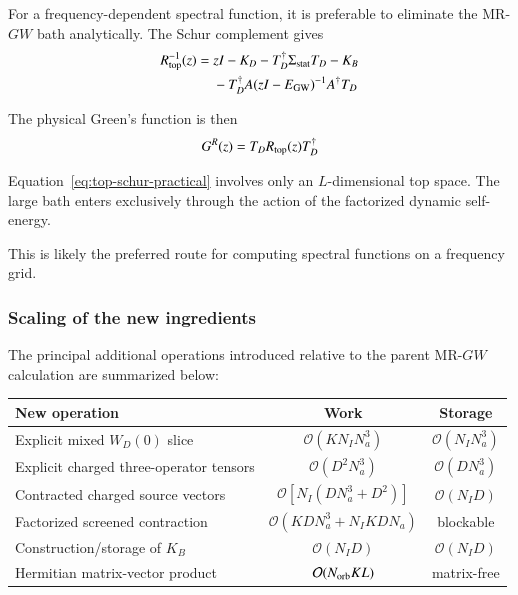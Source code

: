 \documentclass[aip,jcp,reprint,noshowkeys,superscriptaddress]{revtex4-1}
\begin{document}
For a frequency-dependent spectral function, it is preferable to
eliminate the MR-$GW$ bath analytically.  The Schur complement gives
\begin{equation}
  \begin{aligned}
  R_{\rm top}^{-1}(z)
  ={}&
  zI
  -
  K_D
  -
  T_D^\dagger\Sigma_{\rm stat}T_D
  -
  K_B
  \\
  &
  -
  T_D^\dagger
  A
  (zI-E_{\rm GW})^{-1}
  A^\dagger
  T_D
  \end{aligned}
  \label{eq:top-schur-practical}
\end{equation}

The physical Green's function is then
\begin{equation}
  G^R(z)
  =
  T_D
  R_{\rm top}(z)
  T_D^\dagger
  \label{eq:G-top-practical}
\end{equation}

Equation~\eqref{eq:top-schur-practical} involves only an
$L$-dimensional top space.  The large bath enters exclusively through
the action of the factorized dynamic self-energy.

This is likely the preferred route for computing spectral functions on
a frequency grid.


\subsubsection{Scaling of the new ingredients}

The principal additional operations introduced relative to the parent
MR-$GW$ calculation are summarized below:
\begin{center}
\begin{tabular}{l c c}
\hline
New operation
&
Work
&
Storage
\\
\hline
Explicit mixed $W_D(0)$ slice
&
$\mathcal O(KN_IN_a^3)$
&
$\mathcal O(N_IN_a^3)$
\\
Explicit charged three-operator tensors
&
$\mathcal O(D^2N_a^3)$
&
$\mathcal O(DN_a^3)$
\\
Contracted charged source vectors
&
$\mathcal O[N_I(DN_a^3+D^2)]$
&
$\mathcal O(N_ID)$
\\
Factorized screened contraction
&
$\mathcal O(KDN_a^3+N_IKDN_a)$
&
blockable
\\
Construction/storage of $K_B$
&
$\mathcal O(N_ID)$
&
$\mathcal O(N_ID)$
\\
Hermitian matrix-vector product
&
$\mathcal O(N_{\rm orb}KL)$
&
matrix-free
\\
\hline
\end{tabular}
\end{center}
\end{document}
